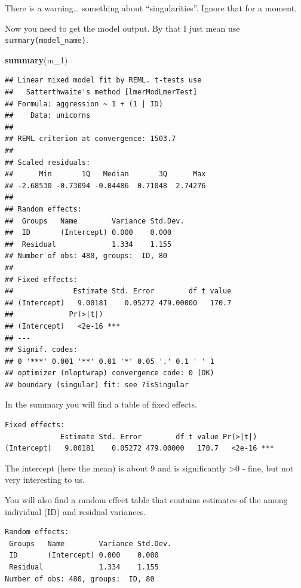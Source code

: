 \documentclass[
  12pt,
]{book}
\newenvironment{Shaded}{\begin{snugshade}}{\end{snugshade}}
\newcommand{\DecValTok}[1]{\textcolor[rgb]{0.00,0.00,0.81}{#1}}
\newcommand{\KeywordTok}[1]{\textcolor[rgb]{0.13,0.29,0.53}{\textbf{#1}}}
\newcommand{\NormalTok}[1]{#1}
\begin{document}
There is a warning\ldots{} something about ``singularities''. Ignore that for a moment.

Now you need to get the model output. By that I just mean use \texttt{summary(model\_name)}.

\begin{Shaded}
\begin{Highlighting}[]
\KeywordTok{summary}\NormalTok{(m\_}\DecValTok{1}\NormalTok{)}
\end{Highlighting}
\end{Shaded}

\begin{verbatim}
## Linear mixed model fit by REML. t-tests use
##   Satterthwaite's method [lmerModLmerTest]
## Formula: aggression ~ 1 + (1 | ID)
##    Data: unicorns
## 
## REML criterion at convergence: 1503.7
## 
## Scaled residuals: 
##      Min       1Q   Median       3Q      Max 
## -2.68530 -0.73094 -0.04486  0.71048  2.74276 
## 
## Random effects:
##  Groups   Name        Variance Std.Dev.
##  ID       (Intercept) 0.000    0.000   
##  Residual             1.334    1.155   
## Number of obs: 480, groups:  ID, 80
## 
## Fixed effects:
##              Estimate Std. Error        df t value
## (Intercept)   9.00181    0.05272 479.00000   170.7
##             Pr(>|t|)    
## (Intercept)   <2e-16 ***
## ---
## Signif. codes:  
## 0 '***' 0.001 '**' 0.01 '*' 0.05 '.' 0.1 ' ' 1
## optimizer (nloptwrap) convergence code: 0 (OK)
## boundary (singular) fit: see ?isSingular
\end{verbatim}

In the summary you will find a table of fixed effects.

\begin{verbatim}
Fixed effects:
             Estimate Std. Error        df t value Pr(>|t|)    
(Intercept)   9.00181    0.05272 479.00000   170.7   <2e-16 ***
\end{verbatim}

The intercept (here the mean) is about 9 and is significantly \textgreater0 - fine, but not very interesting to us.

You will also find a random effect table that contains estimates of the among individual (ID) and residual variances.

\begin{verbatim}
Random effects:
 Groups   Name        Variance Std.Dev.
 ID       (Intercept) 0.000    0.000   
 Residual             1.334    1.155   
Number of obs: 480, groups:  ID, 80
\end{verbatim}
\end{document}
